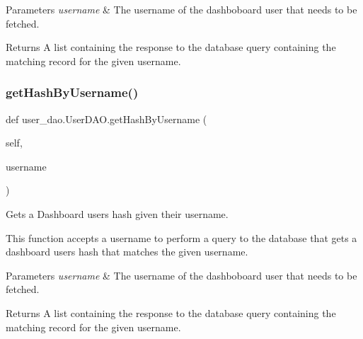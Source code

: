 \begin{DoxyParams}{Parameters}
{\em username} & The username of the dashboboard user that needs to be fetched.\\
\hline
\end{DoxyParams}
\begin{DoxyReturn}{Returns}
A list containing the response to the database query containing the matching record for the given username. 
\end{DoxyReturn}
\mbox{\label{classuser__dao_1_1_user_d_a_o_a8a4332995e7b097e3c992dfb38b5921c}} 
\subsubsection{\texorpdfstring{get\+Hash\+By\+Username()}{getHashByUsername()}}
{\footnotesize\ttfamily def user\+\_\+dao.\+User\+D\+A\+O.\+get\+Hash\+By\+Username (\begin{DoxyParamCaption}\item[{}]{self,  }\item[{}]{username }\end{DoxyParamCaption})}



Gets a Dashboard user\textquotesingle{}s hash given their username. 

This function accepts a username to perform a query to the database that gets a dashboard user\textquotesingle{}s hash that matches the given username.


\begin{DoxyParams}{Parameters}
{\em username} & The username of the dashboboard user that needs to be fetched.\\
\hline
\end{DoxyParams}
\begin{DoxyReturn}{Returns}
A list containing the response to the database query containing the matching record for the given username. 
\end{DoxyReturn}
\mbox{\label{classuser__dao_1_1_user_d_a_o_abe0492f295d9bdc79d56026f9745723b}} 

